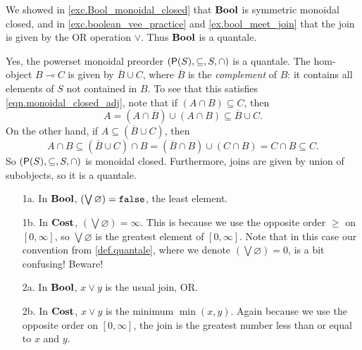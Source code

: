 \documentclass[7Sketches]{subfiles}
\begin{document}
{
We showed in \cref{exc.Bool_monoidal_closed} that $\mathbf{Bool}$ is symmetric
monoidal closed, and in \cref{exc.boolean_vee_practice} and
\cref{ex.bool_meet_join} that the join is given by the OR operation $\vee$.
Thus $\mathbf{Bool}$ is a quantale.
}

{
Yes, the powerset monoidal preorder $(\mathsf{P}(S),\subseteq,S,\cap)$ is a quantale. The
hom-object $B \multimap C$ is given by $\overline{B} \cup C$, where $\overline
B$ is the \emph{complement} of $B$: it contains all elements of $S$ not
contained in $B$. To see that this satisfies \cref{eqn.monoidal_closed_adj},
note that if $(A \cap B) \subseteq C$, then 
\[
A = (A \cap \overline B) \cup (A \cap B) \subseteq \overline B \cup C. 
\]
On the other hand, if $A \subseteq (\overline B \cup C)$, then 
\[
A \cap B \subseteq (\overline B \cup C) \cap B = (\overline B \cap B) \cup (C \cap B) = C \cap B \subseteq C. 
\]
So $(\mathsf{P}(S),\subseteq,S,\cap)$ is monoidal closed. Furthermore, joins are given by union of subobjects,
so it is a quantale.
}

{
\begin{enumerate}
	\item[1a.] In $\mathbf{Bool}$, $(\bigvee\varnothing) = \mathtt{false}$, the least element.
	\item[1b.] In $\mathbf{Cost}$, $(\bigvee\varnothing) = \infty$. This is because we
	use the opposite order $\ge$ on $[0,\infty]$, so $\bigvee\varnothing$ is
	the greatest element of $[0,\infty]$. Note that in this case our
	convention from \cref{def.quantale}, where we denote $(\bigvee\varnothing) = 0$, is a bit confusing! Beware!
	\item[2a.] In $\mathbf{Bool}$, $x \vee y$ is the usual join, OR. 
	\item[2b.] In $\mathbf{Cost}$, $x \vee y$ is the minimum $\min(x,y)$. Again
	because we use the opposite order on $[0,\infty]$, the join is the
	greatest number less than or equal to $x$ and $y$.
\end{enumerate}
}
\end{document}
